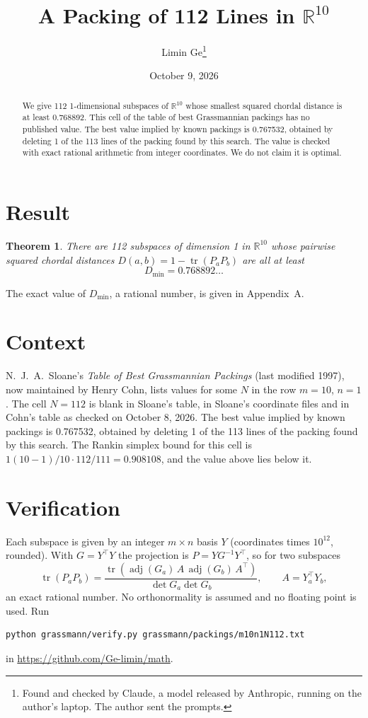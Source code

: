 \documentclass[11pt,a4paper]{article}
\title{A Packing of 112 Lines in $\mathbb{R}^{10}$}
\author{Limin Ge\thanks{Found and checked by Claude, a model released by Anthropic, running on the author's laptop. The author sent the prompts.}}
\date{October 9, 2026}
\newtheorem*{theorem}{Theorem}
\begin{document}
\maketitle
\begin{abstract}
We give 112 1-dimensional subspaces of $\mathbb{R}^{10}$ whose smallest squared chordal distance is at least 0.768892. This cell of the table of best Grassmannian packings has no published value. The best value implied by known packings is 0.767532, obtained by deleting 1 of the 113 lines of the packing found by this search. The value is checked with exact rational arithmetic from integer coordinates. We do not claim it is optimal.
\end{abstract}

\section{Result}
\begin{theorem}
There are 112 subspaces of dimension 1 in $\mathbb{R}^{10}$ whose pairwise squared chordal distances $D(a,b) = 1 - \operatorname{tr}(P_aP_b)$ are all at least
\[ D_{\min} = 0.768892\ldots \]
\end{theorem}
The exact value of $D_{\min}$, a rational number, is given in Appendix~A.


\section{Context}
N.~J.~A.~Sloane's \emph{Table of Best Grassmannian Packings} (last modified 1997), now maintained by Henry Cohn, lists values for some $N$ in the row $m=10$, $n=1$. The cell $N=112$ is blank in Sloane's table, in Sloane's coordinate files and in Cohn's table as checked on October 8, 2026. The best value implied by known packings is 0.767532, obtained by deleting 1 of the 113 lines of the packing found by this search. The Rankin simplex bound for this cell is $1(10-1)/10\cdot 112/111 = 0.908108$, and the value above lies below it.


\section{Verification}
Each subspace is given by an integer $m\times n$ basis $Y$ (coordinates times $10^{12}$, rounded). With $G=Y^\top Y$ the projection is $P=YG^{-1}Y^\top$, so for two subspaces
\[ \operatorname{tr}(P_aP_b)=\frac{\operatorname{tr}(\operatorname{adj}(G_a)\,A\,\operatorname{adj}(G_b)\,A^\top)}{\det G_a\det G_b},\qquad A=Y_a^\top Y_b, \]
an exact rational number. No orthonormality is assumed and no floating point is used. Run
\begin{verbatim}
python grassmann/verify.py grassmann/packings/m10n1N112.txt
\end{verbatim}
in \url{https://github.com/Ge-limin/math}.
\end{document}
